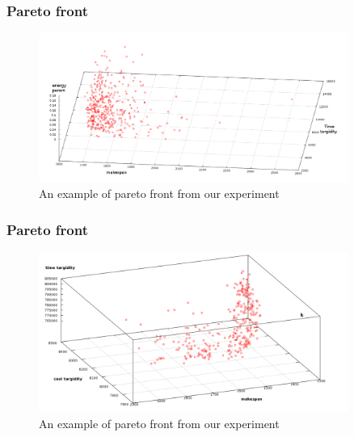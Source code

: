 \documentclass{beamer}
\begin{document}
\begin{frame}[label=paretofrnt1]
 \frametitle{Pareto front}
\begin{figure}[t]
 \begin{center}
  \includegraphics[width=0.90\textwidth]{imgs/pareto3}
 \end{center}
  \caption{An example of pareto front from our experiment \hyperlink{back4}{}}
\end{figure}
\end{frame}

\begin{frame}[label=paretofrnt1]
 \frametitle{Pareto front}
\begin{figure}[t]
 \begin{center}
  \includegraphics[width=0.90\textwidth]{imgs/pareto4}
 \end{center}
  \caption{An example of pareto front from our experiment \hyperlink{back4}{}}
\end{figure}
\end{frame}
\end{document}
